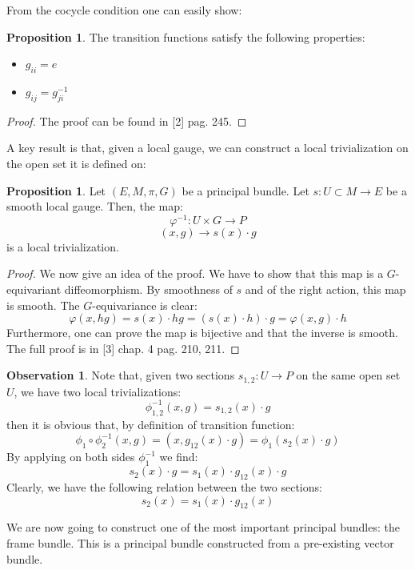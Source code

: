 \documentclass[12pt,a4paper]{report}
\theoremstyle{definition}
\theoremstyle{Theorem}
\newtheorem{Prop}[Def]{Proposition}
\theoremstyle{definition}
\theoremstyle{definition}
\newtheorem{Obs}[Def]{Observation}
\begin{document}
	From the cocycle condition one can easily show:
	\begin{Prop}
		The transition functions satisfy the following properties:
		\begin{itemize}
			\item $g_{ii}=e$
			\item $g_{ij}=g_{ji}^{-1}$
		\end{itemize}
	\end{Prop}
	\begin{proof}
		The proof can be found in [2] pag. 245.
	\end{proof}
	A key result is that, given a local gauge, we can construct a local trivialization on the open set it is defined on:
	\begin{Prop}\label{Prop_3.5.3}
		Let $(E,M,\pi,G)$ be a principal bundle. Let $s:U\subset M\rightarrow E$ be a smooth local gauge. Then, the map:
		$$\varphi^{-1}: U\times G\rightarrow P$$
		$$(x,g)\rightarrow s(x)\cdot g$$
		is a local trivialization.
	\end{Prop}
	\begin{proof}
		We now give an idea of the proof.
		We have to show that this map is a $G$-equivariant diffeomorphism. By smoothness of $s$ and of the right action, this map is smooth. The $G$-equivariance is clear:
		$$\varphi(x,hg)=s(x)\cdot hg=(s(x)\cdot h)\cdot g=\varphi(x,g)\cdot h$$
		Furthermore, one can prove the map is bijective and that the inverse is smooth. The full proof is in [3] chap. 4 pag. 210, 211.
	\end{proof}
	\begin{Obs}\label{Obs_3.5.3}
		Note that, given two sections $s_{1,2}:U\rightarrow P$ on the same open set $U$, we have two local trivializations:
		$$\phi^{-1}_{1,2}(x,g)=s_{1,2}(x)\cdot g$$
		then it is obvious that, by definition of transition function: 
		$$\phi_1\circ\phi_2^{-1}(x,g)=(x,g_{12}(x)\cdot g)=\phi_1(s_{2}(x)\cdot g)$$
		By applying on both sides $\phi_1^{-1}$ we find:
		$$s_2(x)\cdot g=s_1(x)\cdot g_{12}(x)\cdot g$$
		Clearly, we have the following relation between the two sections:
		$$s_2(x)=s_1(x)\cdot g_{12}(x)$$
	\end{Obs}
	We are now going to construct one of the most important principal bundles: the frame bundle. This is a principal bundle constructed from a pre-existing vector bundle.
\end{document}
